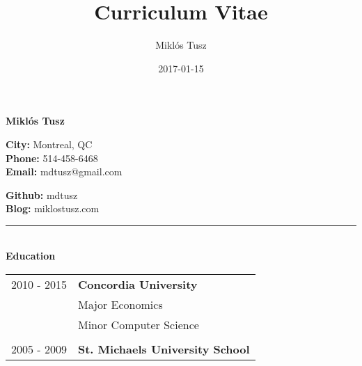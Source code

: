 \documentclass[notitlepage,oneside,draft]{article}
\title{Curriculum Vitae}
\author{Miklós Tusz}
\date{2017-01-15}
\begin{document}
\begin{flushleft}

  \Huge
  \textbf{Miklós Tusz}

  \small

  \begin{multicols}{2}

    \begin{flushleft}
      \textbf{City:} Montreal, QC \\
      \textbf{Phone:} 514-458-6468 \\
      \textbf{Email:} mdtusz@gmail.com \\
    \end{flushleft}

    \begin{flushright}
      \textbf{Github:} mdtusz \\
      \textbf{Blog:} miklostusz.com \\
    \end{flushright}

  \end{multicols}

  \rule{\textwidth}{1pt}\\[6pt]

  \large
  \textbf{Education} \\
  \vspace{12pt}
  \normalsize
  \begin{tabular}{ p{86pt} | l  }
    2010 - 2015 & \textbf{Concordia University} \\
    & Major Economics \\
    & Minor Computer Science \\
    & \\
    2005 - 2009 & \textbf{St. Michaels University School} \\
  \end{tabular}
  \vspace{24pt}



\end{flushleft}
\end{document}
